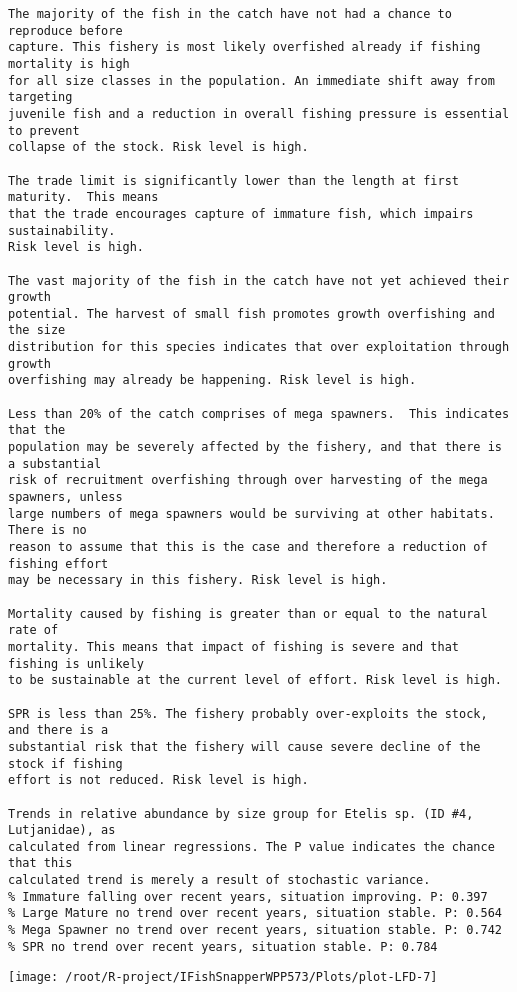 \documentclass{report}\usepackage[]{graphicx}\usepackage[]{color}
\makeatletter
\def\maxwidth{ %
  \ifdim\Gin@nat@width>\linewidth
    \linewidth
  \else
    \Gin@nat@width
  \fi
}
\newenvironment{kframe}{%
 \def\at@end@of@kframe{}%
 \ifinner\ifhmode%
  \def\at@end@of@kframe{\end{minipage}}%
  \begin{minipage}{\columnwidth}%
 \fi\fi%
 \def\FrameCommand##1{\hskip\@totalleftmargin \hskip-\fboxsep
 \colorbox{shadecolor}{##1}\hskip-\fboxsep
     \hskip-\linewidth \hskip-\@totalleftmargin \hskip\columnwidth}%
 \MakeFramed {\advance\hsize-\width
   \@totalleftmargin\z@ \linewidth\hsize
   \@setminipage}}%
 {\par\unskip\endMakeFramed%
 \at@end@of@kframe}
\newenvironment{knitrout}{}{} %
\makeatother
\begin{document}
\begin{knitrout}
\begin{kframe}
\begin{verbatim}
The majority of the fish in the catch have not had a chance to reproduce before
capture. This fishery is most likely overfished already if fishing mortality is high
for all size classes in the population. An immediate shift away from targeting
juvenile fish and a reduction in overall fishing pressure is essential to prevent
collapse of the stock. Risk level is high.

The trade limit is significantly lower than the length at first maturity.  This means
that the trade encourages capture of immature fish, which impairs sustainability.
Risk level is high.

The vast majority of the fish in the catch have not yet achieved their growth
potential. The harvest of small fish promotes growth overfishing and the size
distribution for this species indicates that over exploitation through growth
overfishing may already be happening. Risk level is high.

Less than 20% of the catch comprises of mega spawners.  This indicates that the
population may be severely affected by the fishery, and that there is a substantial
risk of recruitment overfishing through over harvesting of the mega spawners, unless
large numbers of mega spawners would be surviving at other habitats. There is no
reason to assume that this is the case and therefore a reduction of fishing effort
may be necessary in this fishery. Risk level is high.
 
Mortality caused by fishing is greater than or equal to the natural rate of
mortality. This means that impact of fishing is severe and that fishing is unlikely
to be sustainable at the current level of effort. Risk level is high.
 
SPR is less than 25%. The fishery probably over-exploits the stock, and there is a
substantial risk that the fishery will cause severe decline of the stock if fishing
effort is not reduced. Risk level is high.
 
Trends in relative abundance by size group for Etelis sp. (ID #4, Lutjanidae), as
calculated from linear regressions. The P value indicates the chance that this
calculated trend is merely a result of stochastic variance.
% Immature falling over recent years, situation improving. P: 0.397
% Large Mature no trend over recent years, situation stable. P: 0.564
% Mega Spawner no trend over recent years, situation stable. P: 0.742
% SPR no trend over recent years, situation stable. P: 0.784
\end{verbatim}
\end{kframe}
\texttt{[image: /root/R-project/IFishSnapperWPP573/Plots/plot-LFD-7]} 


\end{knitrout}
\end{document}
